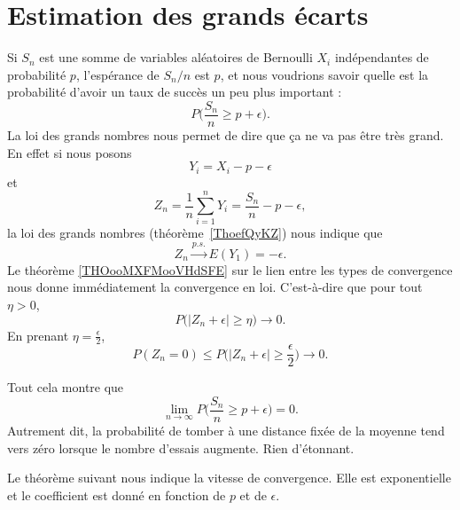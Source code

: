\section{Estimation des grands écarts}

Si \( S_n\) est une somme de variables aléatoires de Bernoulli \( X_i\) indépendantes de probabilité \( p\), l'espérance de \( S_n/n\) est \( p\), et nous voudrions savoir quelle est la probabilité d'avoir un taux de succès un peu plus important :
\begin{equation}
	P\big( \frac{ S_n }{ n }\geq p+\epsilon \big).
\end{equation}
La loi des grands nombres nous permet de dire que ça ne va pas être très grand. En effet si nous posons
\begin{equation}
	Y_i=X_i-p-\epsilon
\end{equation}
et
\begin{equation}
	Z_n=\frac{1}{ n }\sum_{i=1}^nY_i=\frac{ S_n }{ n }-p-\epsilon,
\end{equation}
la loi des grands nombres (théorème~\ref{ThoefQyKZ}) nous indique que
\begin{equation}
	Z_n\stackrel{p.s.}{\longrightarrow}E(Y_1)=-\epsilon.
\end{equation}
Le théorème \ref{THOooMXFMooVHdSFE} sur le lien entre les types de convergence nous donne immédiatement la convergence en loi. C'est-à-dire que pour tout \( \eta>0\),
\begin{equation}
	P\Big( | Z_n+\epsilon |\geq \eta \Big)\to 0.
\end{equation}
En prenant \( \eta=\frac{ \epsilon }{2}\),
\begin{equation}
	P(Z_n=0)\leq P\big( | Z_n+\epsilon |\geq \frac{ \epsilon }{2} \big)\to 0.
\end{equation}

Tout cela montre que
\begin{equation}
	\lim_{n\to \infty} P\big( \frac{ S_n }{ n }\geq p+\epsilon \big)=0.
\end{equation}
Autrement dit, la probabilité de tomber à une distance fixée de la moyenne tend vers zéro lorsque le nombre d'essais augmente. Rien d'étonnant.

Le théorème suivant nous indique la vitesse de convergence. Elle est exponentielle et le coefficient est donné en fonction de \( p\) et de \( \epsilon\).


